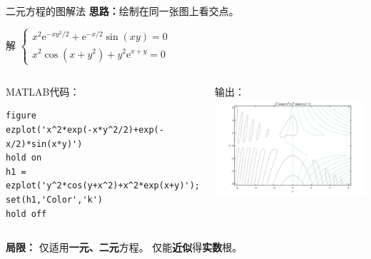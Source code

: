 \documentclass[10pt]{beamer}
\begin{document}
\begin{frame}[fragile]{二元方程的图解法}
		\textbf{思路：}绘制在同一张图上看交点。
	\begin{example}[6-2]解
		$\left\{\begin{array}{l}
		x^{2} \mathrm{e}^{-x y^{2} / 2}+\mathrm{e}^{-x / 2} \sin (x y)=0 \\
		x^{2} \cos \left(x+y^{2}\right)+y^{2} \mathrm{e}^{x+y}=0
		\end{array}\right.$
	
		\begin{columns}[T]
				\begin{block}{MATLAB代码：}
\begin{lstlisting}
figure
ezplot('x^2*exp(-x*y^2/2)+exp(-x/2)*sin(x*y)')
hold on
h1 = ezplot('y^2*cos(y+x^2)+x^2*exp(x+y)');
set(h1,'Color','k')
hold off
\end{lstlisting}
				\end{block}	  		
		
				\begin{block}{输出：}
					\centering
					\includegraphics[width=\textwidth]{12}
				\end{block}
		\end{columns}
	\end{example}

	\textbf{局限：}
仅适用\textbf{一元、二元}方程。
仅能\textbf{近似}得\textbf{实数}根。

\end{frame}
\end{document}
